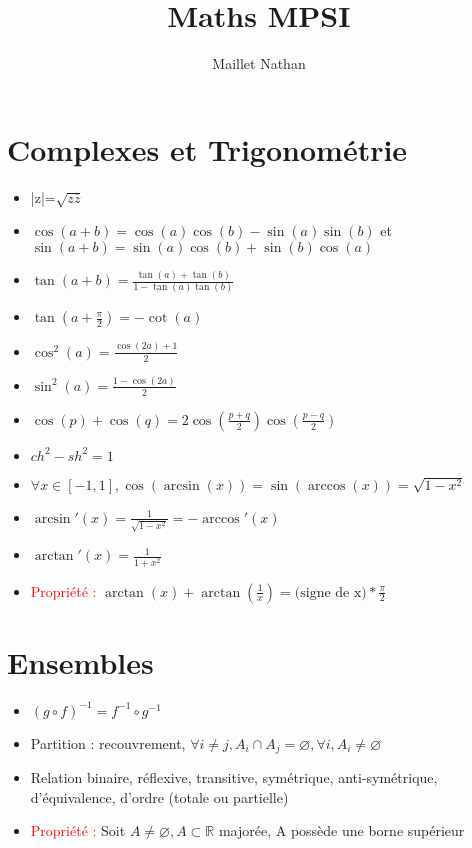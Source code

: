 \documentclass[a4paper, french]{article}
\title{Maths MPSI}
\author{Maillet Nathan}
\date{}
\newcommand{\R}{\mathbb{R}}
\newcommand{\ppt}{\textcolor{red}{Propriété : }}
\newcommand{\inv}[1]{\frac{1}{#1}}
\begin{document}
	\maketitle
	\tableofcontents

	\section{Complexes et Trigonométrie}
	\begin{itemize}[label=\(\bullet\)]
	  \item |z|=$\sqrt{z\overline{z}}$
	  \item $\cos(a+b)=\cos(a)\cos(b)-\sin(a)\sin(b)$ et $\sin(a+b)=\sin(a)\cos(b)+\sin(b)\cos(a)$
	  \item $\tan(a+b)=\frac{\tan(a)+\tan(b)}{1-\tan(a)\tan(b)}$
	  \item $\tan(a+\frac{\pi}{2})=-\cot(a)$
	  \item $\cos^2(a)=\frac{\cos(2a)+1}{2}$
	  \item $\sin^2(a)=\frac{1-\cos(2a)}{2}$
	  \item $\cos(p)+\cos(q)=2\cos(\frac{p+q}{2})\cos(\frac{p-q}{2})$
	  \item $ch^2-sh^2=1$
	  \item $\forall x \in [-1,1], \cos(\arcsin(x))=\sin(\arccos(x))=\sqrt{1-x^2}$
	  \item $\arcsin'(x)=\inv{\sqrt{1-x^2}}=-\arccos'(x)$
	  \item $\arctan'(x)=\inv{1+x^2}$
	  \item \ppt $\arctan(x)+\arctan(\inv{x})=\text{(signe de x)}*\frac{\pi}{2}$
	\end{itemize}

	\section{Ensembles}
	\begin{itemize}[label=\(\bullet\)]
	  \item $(g\circ f)^{-1}=f^{-1}\circ g^{-1}$
	  \item Partition : recouvrement, $\forall i \neq j, A_i \cap A_j=\varnothing, \forall i, A_i \neq \varnothing$
	  \item Relation binaire, réflexive, transitive, symétrique, anti-symétrique, d'équivalence, d'ordre (totale ou partielle)
	  \item \ppt Soit $A \neq \varnothing, A\subset \R$ majorée, A possède une borne supérieur
	\end{itemize}
\end{document}
